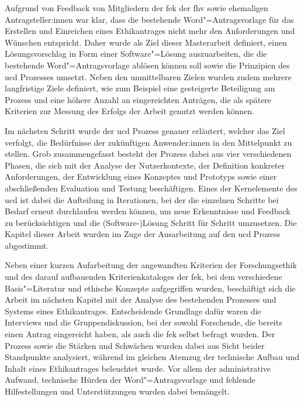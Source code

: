 \documentclass[a4paper,12pt,twoside]{scrreprt}
\begin{document}
Aufgrund von Feedback von Mitgliedern der \ac{fek} der \ac{fhv} sowie ehemaligen Antragsteller:innen war klar, dass die bestehende Word"=Antragsvorlage für das Erstellen und Einreichen eines Ethikantrages nicht mehr den Anforderungen und Wünschen entspricht. Daher wurde als Ziel dieser Masterarbeit definiert, einen Lösungsvorschlag in Form einer Software"=Lösung auszuarbeiten, die die bestehende Word"=Antragsvorlage ablösen können soll sowie die Prinzipien des \acl{ucd} Prozesses umsetzt. Neben den unmittelbaren Zielen wurden zudem mehrere langfristige Ziele definiert, wie zum Beispiel eine gesteigerte Beteiligung am Prozess und eine höhere Anzahl an eingereichten Anträgen, die als spätere Kriterien zur Messung des Erfolgs der Arbeit genutzt werden können.

\medskip

Im nächsten Schritt wurde der \ac{ucd} Prozess genauer erläutert, welcher das Ziel verfolgt, die Bedürfnisse der zukünftigen Anwender:innen in den Mittelpunkt zu stellen. Grob zusammengefasst besteht der Prozess dabei aus vier verschiedenen Phasen, die sich mit der Analyse der Nutzerkontexte, der Definition konkreter Anforderungen, der Entwicklung eines Konzeptes und Prototyps sowie einer abschließenden Evaluation und Testung beschäftigen. Eines der Kernelemente des \ac{ucd} ist dabei die Aufteilung in Iterationen, bei der die einzelnen Schritte bei Bedarf erneut durchlaufen werden können, um neue Erkenntnisse und Feedback zu berücksichtigen und die (Software-)Lösung Schritt für Schritt umzusetzen. Die Kapitel dieser Arbeit wurden im Zuge der Ausarbeitung auf den \ac{ucd} Prozess abgestimmt.

\medskip

Neben einer kurzen Aufarbeitung der angewandten Kriterien der Forschungsethik und des darauf aufbauenden Kriterienkataloges der \ac{fek}, bei dem verschiedene Basis"=Literatur und ethische Konzepte aufgegriffen wurden, beschäftigt sich die Arbeit im nächsten Kapitel mit der Analyse des bestehenden Prozesses und Systems eines Ethikantrages. Entscheidende Grundlage dafür waren die Interviews und die Gruppendiskussion, bei der sowohl Forschende, die bereits einen Antrag eingereicht haben, als auch die \acl{fek} selbst befragt wurden. Der Prozess sowie die Stärken und Schwächen wurden dabei aus Sicht beider Standpunkte analysiert, während im gleichen Atemzug der technische Aufbau und Inhalt eines Ethikantrages beleuchtet wurde. Vor allem der administrative Aufwand, technische Hürden der Word"=Antragsvorlage und fehlende Hilfestellungen und Unterstützungen wurden dabei bemängelt.
\end{document}
